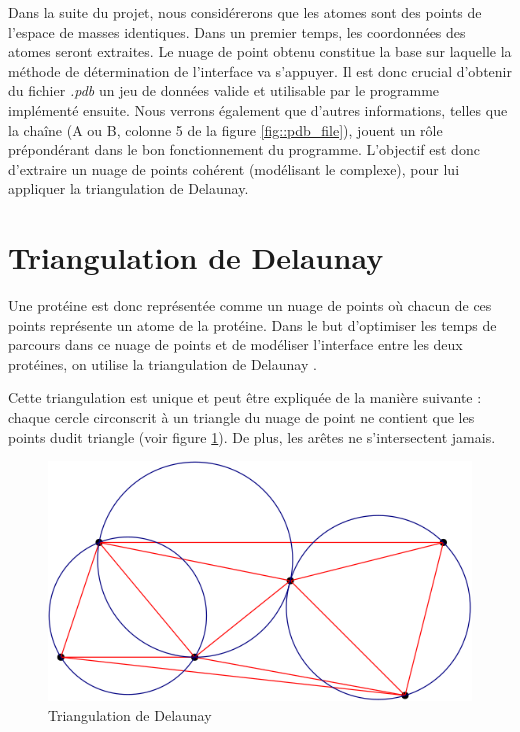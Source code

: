 Dans la suite du projet, nous considérerons que les atomes sont des points de l'espace
de masses identiques. Dans un premier temps, les coordonnées des atomes seront extraites.
Le nuage de point obtenu constitue la base sur laquelle la méthode de détermination
de l'interface va s'appuyer. Il est donc crucial d'obtenir du fichier \textit{.pdb} un jeu
de données valide et utilisable par le programme implémenté ensuite. Nous verrons également
que d'autres informations, telles que la chaîne (A ou B, colonne 5 de la figure
\ref{fig::pdb_file}), jouent un rôle prépondérant dans le bon fonctionnement du
programme. L'objectif est donc d'extraire un nuage de points cohérent (modélisant
le complexe), pour lui appliquer la triangulation de Delaunay.



\section{Triangulation de Delaunay}

Une protéine est donc représentée comme un nuage de points où chacun de ces points
représente un atome de la protéine. Dans le but d'optimiser les temps de parcours dans
ce nuage de points et de modéliser l'interface entre les deux protéines,
 on utilise la triangulation de Delaunay \cite{Triangulation}.

Cette triangulation est unique et peut être expliquée de la manière suivante :
chaque cercle circonscrit à un triangle du nuage de point ne contient que les points
dudit triangle (voir figure \ref{fig::explication_delaunay}). De plus, les arêtes ne
s'intersectent jamais.

\begin{figure}[ht]
\centering
  \includegraphics[width=\textwidth]{figures/explication_delaunay.png}
  \caption{Triangulation de Delaunay}
  \label{fig::explication_delaunay}
\end{figure}


